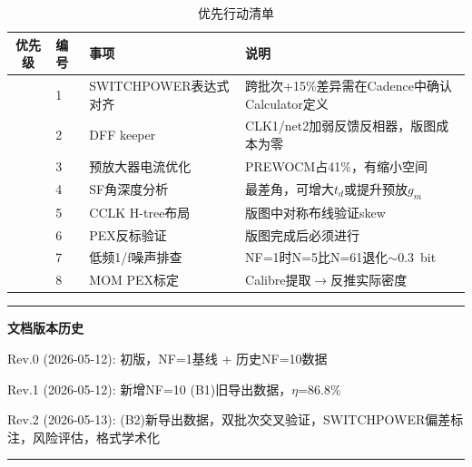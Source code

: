 \documentclass[11pt,a4paper,UTF8]{ctexart}
\begin{document}
\begin{table}[htbp]
\centering
\caption{优先行动清单}
\label{tab:actions}
\footnotesize
\setlength{\tabcolsep}{4pt}
\begin{tabular}{clll}
\toprule
\textbf{优先级} & \textbf{编号} & \textbf{事项} & \textbf{说明} \\
\midrule
\color{red}{P0} & 1 & SWITCHPOWER表达式对齐 & 跨批次+15\%差异需在Cadence中确认Calculator定义 \\
\color{red}{P0} & 2 & DFF keeper & CLK1/net2加弱反馈反相器，版图成本为零 \\

\color{orange}{P1} & 3 & 预放大器电流优化 & PREWOCM占41\%，有缩小空间 \\
\color{orange}{P1} & 4 & SF角深度分析 & 最差角，可增大$t_d$或提升预放$g_m$ \\
\color{orange}{P1} & 5 & CCLK H-tree布局 & 版图中对称布线验证skew \\

\color{green}{P2} & 6 & PEX反标验证 & 版图完成后必须进行 \\
\color{green}{P2} & 7 & 低频1/f噪声排查 & NF=1时N=5比N=61退化$\sim$0.3~bit \\
\color{green}{P2} & 8 & MOM PEX标定 & Calibre提取$\rightarrow$反推实际密度 \\
\bottomrule
\end{tabular}
\end{table}

\vspace{1cm}
\begin{center}
\rule{0.5\textwidth}{0.4pt}
\vspace{0.5cm}

{\small\textbf{文档版本历史}}

{\small Rev.0 (2026-05-12): 初版，NF=1基线 + 历史NF=10数据}

{\small Rev.1 (2026-05-12): 新增NF=10 (B1)旧导出数据，$\eta$=86.8\%}

{\small Rev.2 (2026-05-13): (B2)新导出数据，双批次交叉验证，SWITCHPOWER偏差标注，风险评估，格式学术化}

\vspace{0.5cm}
\rule{0.5\textwidth}{0.4pt}
\end{center}
\end{document}

